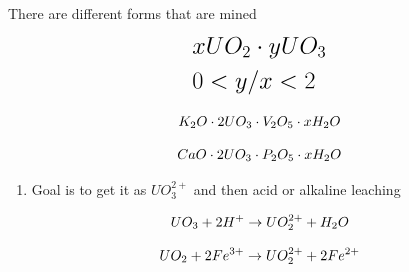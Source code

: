 \documentclass[aspectratio=1610,pdftex,dvipsnames,compress,xcolor={dvipsnames}]{beamer}
\begin{document}
\begin{frame}{There are different forms that are mined}
    \begin{equation}
        \LARGE
        \begin{aligned}
            & xUO_2 \cdot yUO_3
            \\
            & 0 < y/x < 2
        \end{aligned}
    \end{equation}
    
    \begin{equation}
        \LARGE
        K_2O \cdot 2UO_3 \cdot V_2O_5 \cdot xH_2O
    \end{equation}

    \begin{equation}
        \LARGE
        CaO \cdot 2UO_3 \cdot P_2O_5 \cdot xH_2O
    \end{equation}
    
    \vspace*{\fill}

    \begin{enumerate}[topsep=0pt,itemsep=18pt,leftmargin=*,label=(\arabic*)]
        \item[]Goal is to get it as $UO_3^{2+}$ and then acid or alkaline leaching
    \end{enumerate}

    \vspace*{\fill}

    \begin{equation}
        \LARGE
        UO_3 + 2H^+ \rightarrow UO_2^{2+} + H_2O
    \end{equation}

    \begin{equation}
        \LARGE
        UO_2 + 2Fe^{3+} \rightarrow UO_2^{2+} + 2Fe^{2+}
    \end{equation}
\end{frame}
\end{document}
